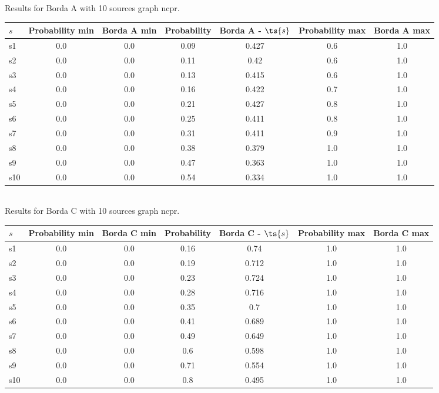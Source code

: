 \documentclass{article}
\begin{document}
\noindent Results for Borda A with 10 sources graph ncpr.

\noindent\begin{tabular}{|l|c|c|c|c|c|c|}
\hline
$s$& Probability min & Borda A min & Probability & Borda A - $\ts{s}$ & Probability max & Borda A max\\
\hline
s1 &0.0 & 0.0 & 0.09 & 0.427 & 0.6 & 1.0\\
\hline
s2 &0.0 & 0.0 & 0.11 & 0.42 & 0.6 & 1.0\\
\hline
s3 &0.0 & 0.0 & 0.13 & 0.415 & 0.6 & 1.0\\
\hline
s4 &0.0 & 0.0 & 0.16 & 0.422 & 0.7 & 1.0\\
\hline
s5 &0.0 & 0.0 & 0.21 & 0.427 & 0.8 & 1.0\\
\hline
s6 &0.0 & 0.0 & 0.25 & 0.411 & 0.8 & 1.0\\
\hline
s7 &0.0 & 0.0 & 0.31 & 0.411 & 0.9 & 1.0\\
\hline
s8 &0.0 & 0.0 & 0.38 & 0.379 & 1.0 & 1.0\\
\hline
s9 &0.0 & 0.0 & 0.47 & 0.363 & 1.0 & 1.0\\
\hline
s10 &0.0 & 0.0 & 0.54 & 0.334 & 1.0 & 1.0\\
\hline
\end{tabular}\\

\noindent Results for Borda C with 10 sources graph ncpr.

\noindent\begin{tabular}{|l|c|c|c|c|c|c|}
\hline
$s$& Probability min & Borda C min & Probability & Borda C - $\ts{s}$ & Probability max & Borda C max\\
\hline
s1 &0.0 & 0.0 & 0.16 & 0.74 & 1.0 & 1.0\\
\hline
s2 &0.0 & 0.0 & 0.19 & 0.712 & 1.0 & 1.0\\
\hline
s3 &0.0 & 0.0 & 0.23 & 0.724 & 1.0 & 1.0\\
\hline
s4 &0.0 & 0.0 & 0.28 & 0.716 & 1.0 & 1.0\\
\hline
s5 &0.0 & 0.0 & 0.35 & 0.7 & 1.0 & 1.0\\
\hline
s6 &0.0 & 0.0 & 0.41 & 0.689 & 1.0 & 1.0\\
\hline
s7 &0.0 & 0.0 & 0.49 & 0.649 & 1.0 & 1.0\\
\hline
s8 &0.0 & 0.0 & 0.6 & 0.598 & 1.0 & 1.0\\
\hline
s9 &0.0 & 0.0 & 0.71 & 0.554 & 1.0 & 1.0\\
\hline
s10 &0.0 & 0.0 & 0.8 & 0.495 & 1.0 & 1.0\\
\hline
\end{tabular}\\
\end{document}
